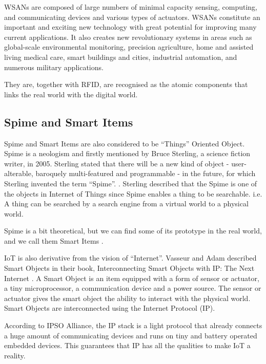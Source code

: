 WSANs are composed of large numbers of minimal capacity sensing, computing, and communicating devices and various types of actuators. WSANs constitute an important and exciting new technology with great potential for improving many current applications. It also creates new revolutionary systems in areas such as global-scale environmental monitoring, precision agriculture, home and assisted living medical care, smart buildings and cities, industrial automation, and numerous military applications. \cite{stankovic2008sensor} 

They are, together with RFID, are recognised as the atomic components that links the real world with the digital world.\cite{sterling2005shaping}

\subsection{Spime and Smart Items}

Spime and Smart Items are also considered to be ``Things'' Oriented Object. Spime is a neologism and firstly mentioned by Bruce Sterling, a science fiction writer, in 2005. Sterling stated that there will be a new kind of object - user-alterable, baroquely multi-featured and programmable - in the future, for which Sterling invented the term ``Spime''. \cite{sterling2005shaping}. Sterling described that the Spime is one of the objects in Internet of Things since Spime enables a thing to be searchable. i.e. A thing can be searched by a search engine from a virtual world to a physical world. \cite{sterling2005shaping} 

Spime is a bit theoretical, but we can find some of its prototype in the real world, and we call them Smart Items \cite{atzori2010internet}.

IoT is also derivative from the vision of ``Internet''. Vasseur and Adam described Smart Objects in their book, Interconnecting Smart Objects with IP: The Next Internet \cite{vasseur2010interconnecting}. A Smart Object is an item equipped with a form of sensor or actuator, a tiny microprocessor, a communication device and a power source. The sensor or actuator gives the smart object the ability to interact with the physical world. Smart Objects are interconnected using the Internet Protocol (IP). 

According to IPSO Alliance, the IP stack is a light protocol that already connects a huge amount of communicating devices and runs on tiny and battery operated embedded devices. This guarantees that IP has all the qualities to make IoT a reality. \cite{atzori2010internet}

